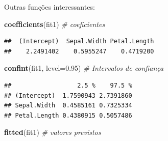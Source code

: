 \documentclass[
]{book}
\newenvironment{Shaded}{\begin{snugshade}}{\end{snugshade}}
\newcommand{\CommentTok}[1]{\textcolor[rgb]{0.56,0.35,0.01}{\textit{#1}}}
\newcommand{\DataTypeTok}[1]{\textcolor[rgb]{0.13,0.29,0.53}{#1}}
\newcommand{\FloatTok}[1]{\textcolor[rgb]{0.00,0.00,0.81}{#1}}
\newcommand{\KeywordTok}[1]{\textcolor[rgb]{0.13,0.29,0.53}{\textbf{#1}}}
\newcommand{\NormalTok}[1]{#1}
\begin{document}
Outras funções interessantes:

\begin{Shaded}
\begin{Highlighting}[]
\KeywordTok{coefficients}\NormalTok{(fit1) }\CommentTok{# coeficientes}
\end{Highlighting}
\end{Shaded}

\begin{verbatim}
##  (Intercept)  Sepal.Width Petal.Length 
##    2.2491402    0.5955247    0.4719200
\end{verbatim}

\begin{Shaded}
\begin{Highlighting}[]
\KeywordTok{confint}\NormalTok{(fit1, }\DataTypeTok{level=}\FloatTok{0.95}\NormalTok{) }\CommentTok{# Intervalos de confiança}
\end{Highlighting}
\end{Shaded}

\begin{verbatim}
##                  2.5 %    97.5 %
## (Intercept)  1.7590943 2.7391860
## Sepal.Width  0.4585161 0.7325334
## Petal.Length 0.4380915 0.5057486
\end{verbatim}

\begin{Shaded}
\begin{Highlighting}[]
\KeywordTok{fitted}\NormalTok{(fit1) }\CommentTok{# valores previstos}
\end{Highlighting}
\end{Shaded}
\end{document}

